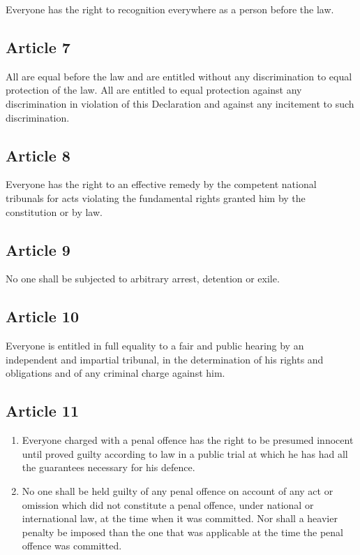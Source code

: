 \documentclass[
  ngerman,
  american,
  titlepage,
  openright,
  DIV=calc,
  toc=listof,
  listof=nochaptergap]{scrbook}
\begin{document}
Everyone has the right to recognition everywhere as a person before the
law.

\subsection{Article 7}\label{article-7-4}

All are equal before the law and are entitled without any discrimination
to equal protection of the law. All are entitled to equal protection
against any discrimination in violation of this Declaration and against
any incitement to such discrimination.

\subsection{Article 8}\label{article-8-4}

Everyone has the right to an effective remedy by the competent national
tribunals for acts violating the fundamental rights granted him by the
constitution or by law.

\subsection{Article 9}\label{article-9-4}

No one shall be subjected to arbitrary arrest, detention or exile.

\subsection{Article 10}\label{article-10-4}

Everyone is entitled in full equality to a fair and public hearing by an
independent and impartial tribunal, in the determination of his rights
and obligations and of any criminal charge against him.

\subsection{Article 11}\label{article-11-4}

\begin{enumerate}
\def\labelenumi{\arabic{enumi}.}
\item
  Everyone charged with a penal offence has the right to be presumed
  innocent until proved guilty according to law in a public trial at
  which he has had all the guarantees necessary for his defence.
\item
  No one shall be held guilty of any penal offence on account of any act
  or omission which did not constitute a penal offence, under national
  or international law, at the time when it was committed. Nor shall a
  heavier penalty be imposed than the one that was applicable at the
  time the penal offence was committed.
\end{enumerate}
\end{document}
